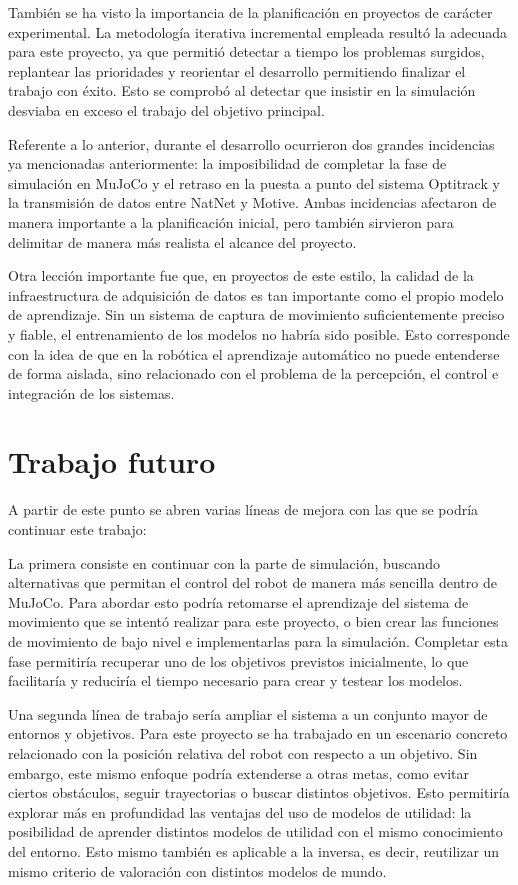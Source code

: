 También se ha visto la importancia de la planificación en proyectos de carácter experimental. La metodología iterativa incremental empleada resultó la adecuada para este proyecto, ya que permitió 
detectar a tiempo los problemas surgidos, replantear las prioridades y reorientar el desarrollo permitiendo finalizar el trabajo con éxito. Esto se comprobó al detectar que insistir en la 
simulación desviaba en exceso el trabajo del objetivo principal.

Referente a lo anterior, durante el desarrollo ocurrieron dos grandes incidencias ya mencionadas anteriormente: la imposibilidad de completar la fase de simulación en MuJoCo y el retraso en la 
puesta a punto del sistema Optitrack y la transmisión de datos entre NatNet y Motive. Ambas incidencias afectaron de manera importante a la planificación inicial, pero también sirvieron para 
delimitar de manera más realista el alcance del proyecto.

Otra lección importante fue que, en proyectos de este estilo, la calidad de la infraestructura de adquisición de datos es tan importante como el propio modelo de aprendizaje. Sin un sistema de 
captura de movimiento suficientemente preciso y fiable, el entrenamiento de los modelos no habría sido posible. Esto corresponde con la idea de que en la robótica el aprendizaje automático no 
puede entenderse de forma aislada, sino relacionado con el problema de la percepción, el control e integración de los sistemas.


\section{Trabajo futuro}
\label{sec:trabajo_futuro}

A partir de este punto se abren varias líneas de mejora con las que se podría continuar este trabajo:

La primera consiste en continuar con la parte de simulación, buscando alternativas que permitan el control del robot de manera más sencilla dentro de MuJoCo. Para abordar esto podría retomarse 
el aprendizaje del sistema de movimiento que se intentó realizar para este proyecto, o bien crear las funciones de movimiento de bajo nivel e implementarlas para la simulación. Completar esta 
fase permitiría recuperar uno de los objetivos previstos inicialmente, lo que facilitaría y reduciría el tiempo necesario para crear y testear los modelos.

Una segunda línea de trabajo sería ampliar el sistema a un conjunto mayor de entornos y objetivos. Para este proyecto se ha trabajado en un escenario concreto relacionado con la posición 
relativa del robot con respecto a un objetivo. Sin embargo, este mismo enfoque podría extenderse a otras metas, como evitar ciertos obstáculos, seguir trayectorias o buscar distintos 
objetivos. Esto permitiría explorar más en profundidad las ventajas del uso de modelos de utilidad: la posibilidad de aprender distintos modelos de utilidad con el mismo conocimiento del 
entorno. Esto mismo también es aplicable a la inversa, es decir, reutilizar un mismo criterio de valoración con distintos modelos de mundo.

